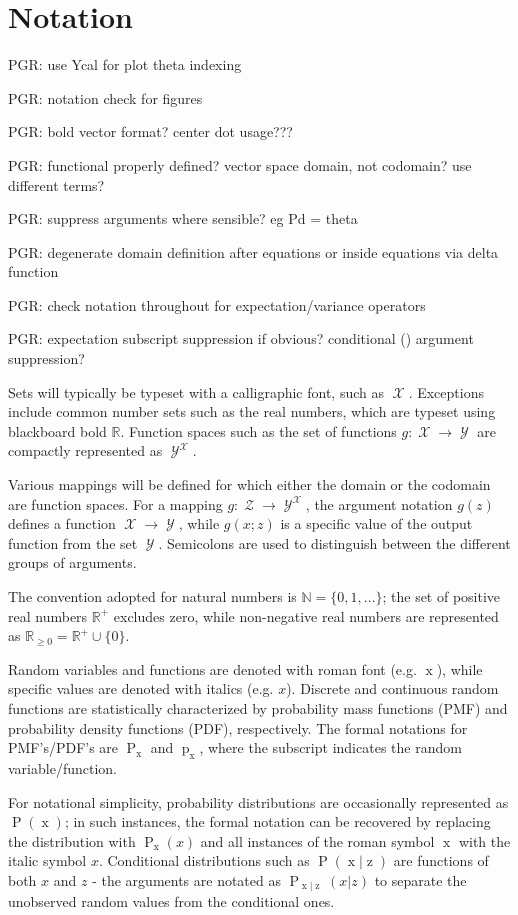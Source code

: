 \documentclass[12pt]{report}
\DeclareMathOperator{\xrm}{\mathrm{x}}
\DeclareMathOperator{\zrm}{\mathrm{z}}
\DeclareMathOperator{\Prm}{\mathrm{P}}
\DeclareMathOperator{\prm}{\mathrm{p}}
\DeclareMathOperator{\Xcal}{\mathcal{X}}
\DeclareMathOperator{\Ycal}{\mathcal{Y}}
\DeclareMathOperator{\Zcal}{\mathcal{Z}}
\begin{document}
\section{Notation}

PGR: use Ycal for plot theta indexing

PGR: notation check for figures

PGR: bold vector format? center dot usage???

PGR: functional properly defined? vector space domain, not codomain? use different terms?

PGR: suppress arguments where sensible? eg Pd = theta

PGR: degenerate domain definition after equations or inside equations via delta function

PGR: check notation throughout for expectation/variance operators

PGR: expectation subscript suppression if obvious? conditional () argument suppression?

Sets will typically be typeset with a calligraphic font, such as $\Xcal$. Exceptions include common number sets such as the real numbers, which are typeset using blackboard bold $\mathbb{R}$. Function spaces such as the set of functions $g : \Xcal \to \Ycal$ are compactly represented as $\Ycal^{\Xcal}$.

Various mappings will be defined for which either the domain or the codomain are function spaces. For a mapping $g : \Zcal \to \Ycal^{\Xcal}$, the argument notation $g(z)$ defines a function $\Xcal \to \Ycal$, while $g(x;z)$ is a specific value of the output function from the set $\Ycal$. Semicolons are used to distinguish between the different groups of arguments.

The convention adopted for natural numbers is $\mathbb{N} = \{0,1,\ldots\}$; the set of positive real numbers $\mathbb{R}^+$ excludes zero, while non-negative real numbers are represented as $\mathbb{R}_{\geq 0} = \mathbb{R}^+ \cup \{0\}$.

Random variables and functions are denoted with roman font (e.g. $\xrm$), while specific values are denoted with italics (e.g. $x$). Discrete and continuous random functions are statistically characterized by probability mass functions (PMF) and probability density functions (PDF), respectively. The formal notations for PMF's/PDF's are $\Prm_{\xrm}$ and $\prm_{\xrm}$, where the subscript indicates the random variable/function. 

For notational simplicity, probability distributions are occasionally represented as $\Prm(\xrm)$; in such instances, the formal notation can be recovered by replacing the distribution with $\Prm_{\xrm}(x)$ and all instances of the roman symbol $\xrm$ with the italic symbol $x$. Conditional distributions such as $\Prm(\xrm|\zrm)$ are functions of both $x$ and $z$ - the arguments are notated as $\Prm_{\xrm | \zrm}(x|z)$ to separate the unobserved random values from the conditional ones.
\end{document}
